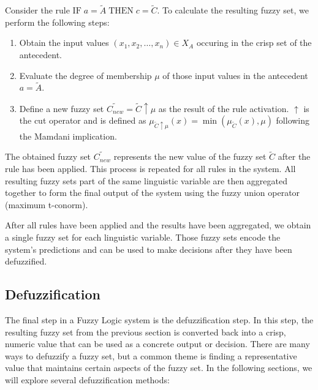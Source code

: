 Consider the rule $\text{IF} \; a = \tilde{A} \; \text{THEN} \; c = \tilde{C}$. To calculate the resulting fuzzy set, we perform the following steps:

\begin{enumerate}
      \item Obtain the input values $(x_1, x_2, \ldots, x_n) \in X_{A}$ occuring in the crisp set of the antecedent.
      \item Evaluate the degree of membership $\mu$ of those input values in the antecedent $a = \tilde{A}$.
      \item Define a new fuzzy set $\tilde{C_{new}}=\tilde{C}\uparrow \mu$ as the result of the rule activation. $\uparrow$ is the cut operator and is defined as $\mu_{\tilde{C}\uparrow \mu}(x) = \min(\mu_{\tilde{C}}(x), \mu)$ following the Mamdani implication.
\end{enumerate}

The obtained fuzzy set $\tilde{C_{new}}$ represents the new value of the fuzzy set $\tilde{C}$ after the rule has been applied. This process is repeated for all rules in the system. All resulting fuzzy sets part of the same linguistic variable are then aggregated together to form the final output of the system using the fuzzy union operator (maximum t-conorm).

After all rules have been applied and the results have been aggregated, we obtain a single fuzzy set for each linguistic variable. Those fuzzy sets encode the system's predictions and can be used to make decisions after they have been defuzzified.

\subsection{Defuzzification}

The final step in a Fuzzy Logic system is the defuzzification step. In this step, the resulting fuzzy set from the previous section is converted back into a crisp, numeric value that can be used as a concrete output or decision. There are many ways to defuzzify a fuzzy set, but a common theme is finding a representative value that maintains certain aspects of the fuzzy set. In the following sections, we will explore several defuzzification methods:

